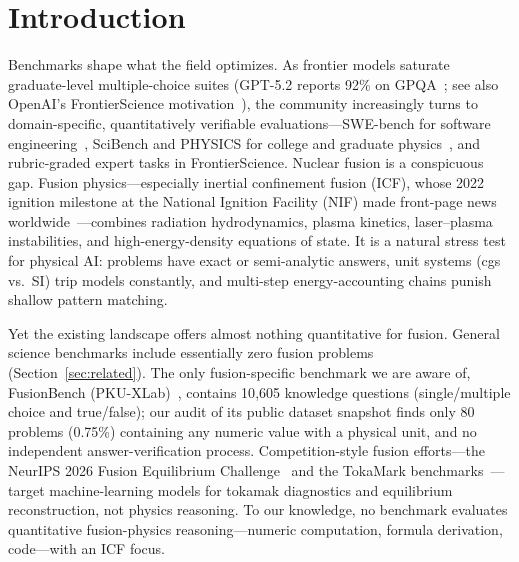 \section{Introduction}
\label{sec:intro}

Benchmarks shape what the field optimizes. As frontier models saturate graduate-level multiple-choice suites (GPT-5.2 reports 92\% on GPQA~\cite{rein2023gpqa}; see also OpenAI's FrontierScience motivation~\cite{openai2025frontierscience}), the community increasingly turns to domain-specific, quantitatively verifiable evaluations---SWE-bench for software engineering~\cite{jimenez2023swebench}, SciBench and PHYSICS for college and graduate physics~\cite{wang2023scibench,feng2025physics}, and rubric-graded expert tasks in FrontierScience. Nuclear fusion is a conspicuous gap. Fusion physics---especially inertial confinement fusion (ICF), whose 2022 ignition milestone at the National Ignition Facility (NIF) made front-page news worldwide~\cite{llnl2022ignition}---combines radiation hydrodynamics, plasma kinetics, laser--plasma instabilities, and high-energy-density equations of state. It is a natural stress test for physical AI: problems have exact or semi-analytic answers, unit systems (cgs vs.\ SI) trip models constantly, and multi-step energy-accounting chains punish shallow pattern matching.

Yet the existing landscape offers almost nothing quantitative for fusion. General science benchmarks include essentially zero fusion problems (Section~\ref{sec:related}). The only fusion-specific benchmark we are aware of, FusionBench (PKU-XLab)~\cite{pkufusionbench}, contains 10{,}605 knowledge questions (single/multiple choice and true/false); our audit of its public dataset snapshot finds only 80 problems (0.75\%) containing any numeric value with a physical unit, and no independent answer-verification process. Competition-style fusion efforts---the NeurIPS 2026 Fusion Equilibrium Challenge~\cite{sophelio2026fec} and the TokaMark benchmarks~\cite{gupta2026tokamark,ibm2026tokamark}---target machine-learning models for tokamak diagnostics and equilibrium reconstruction, not physics reasoning. To our knowledge, no benchmark evaluates quantitative fusion-physics reasoning---numeric computation, formula derivation, code---with an ICF focus.

